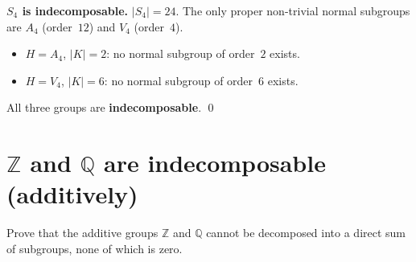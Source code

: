 \documentclass[12pt,a4paper]{article}
\newenvironment{problem}{\begin{mdframed}[style=problemstyle]}{\end{mdframed}}
\newenvironment{sol}{\begin{mdframed}[style=solstyle]}{\end{mdframed}}
\newcommand{\Z}{\mathbb{Z}}
\newcommand{\Q}{\mathbb{Q}}
\begin{document}
\begin{sol}
\textbf{\color{SectCol}$S_4$ is indecomposable.}\;
$|S_4|=24$. The only proper non-trivial normal subgroups are $A_4$ (order~$12$)
and $V_4$ (order~$4$).
\begin{itemize}[leftmargin=*]
  \item $H = A_4$, $|K|=2$: no normal subgroup of order~$2$ exists.
  \item $H = V_4$, $|K|=6$: no normal subgroup of order~$6$ exists.
\end{itemize}

All three groups are \textbf{indecomposable}. \qed
\end{sol}

\bigskip
\section{$\Z$ and $\Q$ are indecomposable (additively)}

\begin{problem}
Prove that the additive groups $\Z$ and $\Q$ cannot be decomposed into a
direct sum of subgroups, none of which is zero.
\end{problem}
\end{document}
